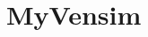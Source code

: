 \chapter{My\+Vensim }
\hypertarget{md__r_e_a_d_m_e}{}\label{md__r_e_a_d_m_e}
\label{md__r_e_a_d_m_e_autotoc_md0}%
%

